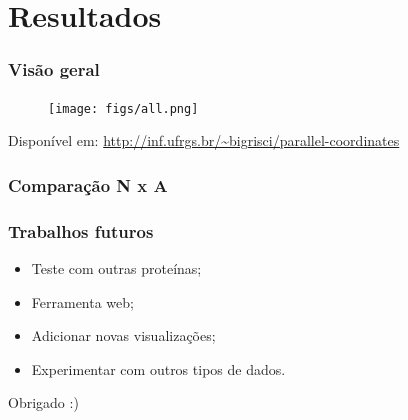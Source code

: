 \documentclass{beamer}
\begin{document}
\section{Resultados} %

\begin{frame}
\frametitle{Visão geral}
\begin{figure}
\texttt{[image: figs/all.png]}
\end{figure}
Disponível em: \url{http://inf.ufrgs.br/~bigrisci/parallel-coordinates}
\end{frame}

\begin{frame}
\frametitle{Comparação N x A}

\end{frame}

\begin{frame}
\frametitle{Trabalhos futuros}
\begin{itemize}
\item Teste com outras proteínas;
\item Ferramenta web;
\item Adicionar novas visualizações;
\item Experimentar com outros tipos de dados.
\end{itemize}
\end{frame}

\begin{frame}
\Huge{\centerline{Obrigado :)}}
\end{frame}

\end{document}
